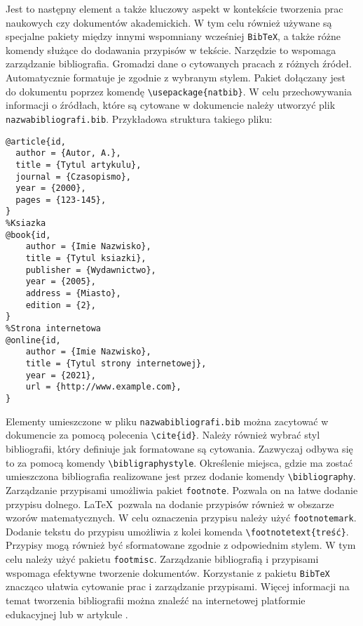 
Jest to następny element a także kluczowy aspekt w kontekście tworzenia prac naukowych czy dokumentów akademickich. W tym celu również używane są specjalne pakiety między innymi wspomniany wcześniej \texttt{BibTeX}, a także różne komendy służące do dodawania przypisów w tekście. Narzędzie to wspomaga zarządzanie bibliografia. Gromadzi dane o cytowanych pracach z różnych źródeł. Automatycznie formatuje je zgodnie z wybranym stylem. Pakiet dołączany jest do dokumentu poprzez komendę \texttt{\textbackslash usepackage{\{natbib\}}}. W celu przechowywania informacji o źródłach, które są cytowane w dokumencie należy utworzyć plik \texttt{nazwa\textunderscore bibliografi.bib}. Przykładowa struktura takiego pliku:
\begin{lstlisting}[caption={Przykłady dodawania do bibliografii}, label=lst:Przykład dodawania do Bibliografii]
%Artykul
@article{id,
  author = {Autor, A.},
  title = {Tytul artykulu},
  journal = {Czasopismo},
  year = {2000},
  pages = {123-145},
}
%Ksiazka
@book{id,
	author = {Imie Nazwisko},
	title = {Tytul ksiazki},
	publisher = {Wydawnictwo},
	year = {2005},
	address = {Miasto},
	edition = {2},
}
%Strona internetowa
@online{id,
	author = {Imie Nazwisko},
	title = {Tytul strony internetowej},
	year = {2021},
	url = {http://www.example.com},
}
\end{lstlisting}
Elementy umieszczone w pliku \texttt{nazwabibliografi.bib} można zacytować w dokumencie za pomocą polecenia \texttt{\textbackslash cite{\{id}\}}. Należy również wybrać styl bibliografii, który definiuje jak formatowane są cytowania. Zazwyczaj odbywa się to za pomocą komendy \texttt{\textbackslash bibligraphystyle}. Określenie miejsca, gdzie ma zostać umieszczona bibliografia realizowane jest przez dodanie komendy \texttt{\textbackslash bibliography}. Zarządzanie przypisami umożliwia pakiet \texttt{footnote}. Pozwala on na łatwe dodanie przypisu dolnego. \LaTeX\ pozwala na dodanie przypisów również w obszarze wzorów matematycznych. W celu oznaczenia przypisu należy użyć \texttt{footnotemark}. Dodanie tekstu do przypisu umożliwia z kolei komenda \texttt{\textbackslash footnotetext{\{treść}\}}. Przypisy mogą również być sformatowane zgodnie z odpowiednim stylem. W tym celu należy użyć pakietu \texttt{footmisc}. Zarządzanie bibliografią i przypisami wspomaga efektywne tworzenie dokumentów. Korzystanie z pakietu \texttt{BibTeX} znacząco ułatwia cytowanie prac i zarządzanie przypisami. Więcej informacji na temat tworzenia bibliografii można znaleźć na internetowej platformie edukacyjnej \cite{Vellage2017} lub w artykule \cite{Cleary2004}. 
